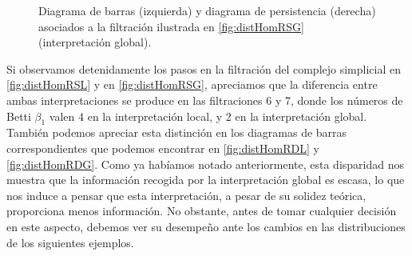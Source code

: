 \documentclass[12pt, a4paper, twoside]{book}
\numberwithin{equation}{section}
\theoremstyle{definition}
\newenvironment{ejem}
  {\pushQED{\qed}\renewcommand{\qedsymbol}{$\blacktriangleleft$}\ejemplo}
  {\popQED\endejemplo}
\theoremstyle{remark}
\theoremstyle{plain}
\begin{document}
\begin{ejem}
\begin{figure}[!htbp]
\begin{figure}[H]
			\end{figure}
		\endminipage
			\begin{figure}[H]
			\end{figure}
		\endminipage
		\caption{Diagrama de barras (izquierda) y diagrama de 
		persistencia (derecha) asociados a la filtración ilustrada en 
		\ref{fig:distHomRSG} (interpretación global).}
		\label{fig:distHomRDG}
	\end{figure}

	Si observamos detenidamente los pasos en la filtración del complejo 
	simplicial en \autoref{fig:distHomRSL} y en \autoref{fig:distHomRSG}, 
	apreciamos que la diferencia entre ambas interpretaciones se produce 
	en las filtraciones 6 y 7, donde los números de Betti $\beta_{1}$ 
	valen 4 en la interpretación local, y 2 en la interpretación global. 
	También podemos apreciar esta distinción en los diagramas de barras 
	correspondientes que podemos encontrar en \autoref{fig:distHomRDL} y 
	\autoref{fig:distHomRDG}. Como ya habíamos notado anteriormente, esta 
	disparidad nos muestra que la información recogida por la 
	interpretación global es escasa, lo que nos induce a pensar que esta 
	interpretación, a pesar de su solidez teórica, proporciona menos 
	información. No 
	obstante, antes de tomar cualquier decisión en este aspecto, debemos 
	ver su desempeño ante los cambios en las distribuciones de los 
	siguientes ejemplos. 
	\end{ejem}
	
\end{document}
